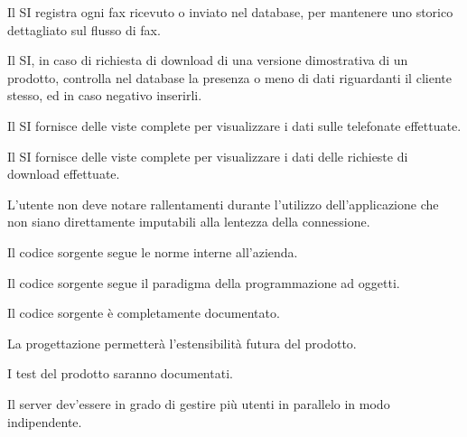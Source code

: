 \begin{elenconumerato}{\subsubsecindent}
\item{Il SI registra ogni fax ricevuto o inviato nel database, per mantenere uno storico dettagliato sul flusso di fax.}
\item{Il SI, in caso di richiesta di download di una versione dimostrativa di un prodotto, controlla nel database la presenza o meno di dati riguardanti il cliente stesso, ed in caso negativo inserirli.}
\item{Il SI fornisce delle viste complete per visualizzare i dati sulle telefonate effettuate.}
\item{Il SI fornisce delle viste complete per visualizzare i dati delle richieste di download effettuate.}

\end{elenconumerato}



\begin{elenconumerato}{\subsubsecindent}
\item  L'utente non deve notare rallentamenti durante l'utilizzo dell'applicazione che non siano direttamente imputabili alla lentezza della connessione.
\end{elenconumerato}

\begin{elenconumerato}{\subsubsecindent}
\item Il codice sorgente segue le norme interne all'azienda.
\item Il codice sorgente segue il paradigma della programmazione ad oggetti.
\item Il codice sorgente \`e completamente documentato.
\item La progettazione permetter\`a l'estensibilit\`a futura del prodotto.
\item I test del prodotto saranno documentati.
\item Il server dev'essere in grado di gestire pi\`u utenti in parallelo in modo indipendente.
\end{elenconumerato}


